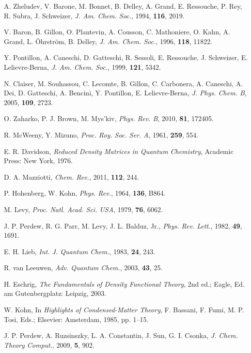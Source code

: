 \documentclass[%
 preprint, linenumbers,
 amsmath,amssymb,
 aps, physrev,
]{revtex4-2}
\begin{document}
\begin{thebibliography}{144}
 A. Zheludev, V. Barone, M. Bonnet, B. Delley, A. Grand, E. Ressouche, P. Rey, R. Subra, J. Schweizer, \textit{J. Am. Chem. Soc.}, 1994, \textbf{116}, 2019.

 V. Baron, B. Gillon, O. Plantevin, A. Cousson, C. Mathoniere, O. Kahn, A. Grand, L. Öhrström, B. Delley, \textit{J. Am. Chem. Soc.}, 1996, \textbf{118}, 11822.

 Y. Pontillon, A. Caneschi, D. Gatteschi, R. Sessoli, E. Ressouche, J. Schweizer, E. Lelievre-Berna, \textit{J. Am. Chem. Soc.}, 1999, \textbf{121}, 5342.

 N. Claiser, M. Souhassou, C. Lecomte, B. Gillon, C. Carbonera, A. Caneschi, A. Dei, D. Gatteschi, A. Bencini, Y. Pontillon, E. Lelievre-Berna, \textit{J. Phys. Chem. B}, 2005, \textbf{109}, 2723.

 O. Zaharko, P. J. Brown, M. Mys’kiv, \textit{Phys. Rev. B}, 2010, \textbf{81}, 172405.

 R. McWeeny, Y. Mizuno, \textit{Proc. Roy. Soc. Ser. A}, 1961, \textbf{259}, 554.

 E. R. Davidson, \textit{Reduced Density Matrices in Quantum Chemistry}, Academic Press: New York, 1976.

 D. A. Mazziotti, \textit{Chem. Rev.}, 2011, \textbf{112}, 244.

 P. Hohenberg, W. Kohn, \textit{Phys. Rev.}, 1964, \textbf{136}, B864.

 M. Levy, \textit{Proc. Natl. Acad. Sci. USA}, 1979, \textbf{76}, 6062.

 J. P. Perdew, R. G. Parr, M. Levy, J. L. Balduz, Jr., \textit{Phys. Rev. Lett.}, 1982, \textbf{49}, 1691.

 E. H. Lieb, \textit{Int. J. Quantum Chem.}, 1983, \textbf{24}, 243.

 R. van Leeuwen, \textit{Adv. Quantum Chem.}, 2003, \textbf{43}, 25.

 H. Eschrig, \textit{The Fundamentals of Density Functional Theory}, 2nd ed.; Eagle, Ed. am Gutenbergplatz: Leipzig, 2003.

 W. Kohn, In \textit{Highlights of Condensed-Matter Theory}, F. Bassani, F. Fumi, M. P. Tosi, Eds.; Elsevier: Amsterdam, 1985, pp. 1–15.

 J. P. Perdew, A. Ruzsinszky, L. A. Constantin, J. Sun, G. I. Csonka, \textit{J. Chem. Theory Comput.}, 2009, \textbf{5}, 902.


\end{thebibliography}
\end{document}
